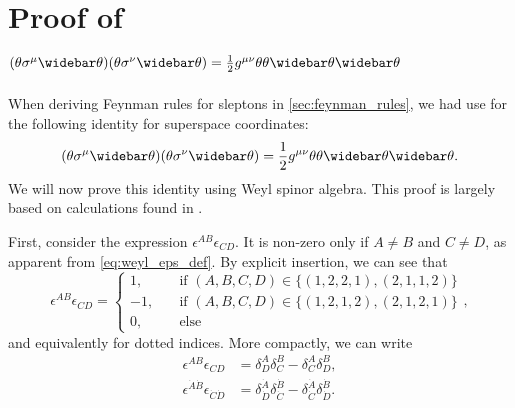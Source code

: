 \section{Proof of \texorpdfstring{$(\theta\sigma^\mu\thetabar)(\theta\sigma^\nu\thetabar) = \frac{1}{2}g^{\mu\nu}\thetafour$}{(θσθ)(θσθ)= 1/2gμνθθθθ}}\label{app:weyl_proof}
When deriving Feynman rules for sleptons in \cref{sec:feynman_rules}, we had use for the following identity for superspace coordinates:
\begin{equation}
    (\theta\sigma^\mu\thetabar)(\theta\sigma^\nu\thetabar) = \frac{1}{2}g^{\mu\nu}\thetafour.
\end{equation}
We will now prove this identity using Weyl spinor algebra. This proof is largely based on calculations found in \cite{IntrSUSY2010}.

First, consider the expression $\epsilon^{AB}\epsilon_{CD}$. It is non-zero only if $A\neq B$ and $C\neq D$, as apparent from \cref{eq:weyl_eps_def}.
By explicit insertion, we can see that
\begin{equation}
    \epsilon^{AB}\epsilon_{CD} = \begin{cases}
        1, \quad & \text{if } (A,B,C,D) \in \{(1,2,2,1),(2,1,1,2)\}
        \\
        -1, \quad & \text{if } (A,B,C,D) \in \{(1,2,1,2),(2,1,2,1)\}
        \\
        0, \quad & \text{else}
    \end{cases},
\end{equation}
and equivalently for dotted indices. More compactly, we can write
\begin{subequations}
\label{eq:weyl_proof_epsABCD}
\begin{align}
    \epsilon^{AB}\epsilon_{CD} &= \delta^A_D\delta^B_C - \delta^A_C\delta^B_D,
    \\
    \epsilon^{\dot{A}\dot{B}}\epsilon_{\dot{C}\dot{D}} &= \delta^{\dot{A}}_{\dot{D}}\delta^{\dot{B}}_{\dot{C}} - \delta^{\dot{A}}_{\dot{C}}\delta^{\dot{B}}_{\dot{D}}.
\end{align}
\end{subequations}


